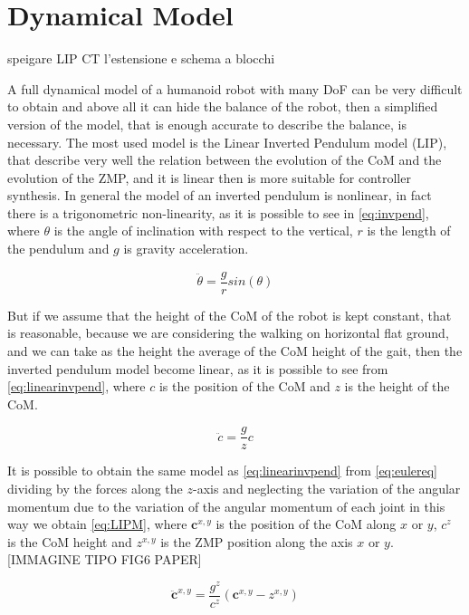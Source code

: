 \documentclass[a4paper]{article}
\begin{document}
\section{Dynamical Model}
speigare LIP CT l'estensione e schema a blocchi 

A full dynamical model of a humanoid robot with many DoF can be very difficult to obtain and above all it can hide the balance of the robot, then a simplified version of the model, that is enough accurate to describe the balance, is necessary. The most used model is the Linear Inverted Pendulum model (LIP), that describe very well the relation between the evolution of the CoM and the evolution of the ZMP, and it is linear then is more suitable for controller synthesis. In general the model of an inverted pendulum is nonlinear, in fact there is a trigonometric non-linearity, as it is possible to see in \ref{eq:invpend}, where $\theta$ is the angle of inclination with respect to the vertical, $r$ is the length of the pendulum and $g$ is gravity acceleration. 

\begin{equation}
\ddot{\theta} = \frac{g}{r}sin(\theta)
\label{eq:invpend}
\end{equation} 

But if we assume that the height of the CoM of the robot is kept constant, that is reasonable, because we are considering the walking on horizontal flat ground, and we can take as the height the average of the CoM height of the gait, then the inverted pendulum model become linear, as it is possible to see from \ref{eq:linearinvpend}, where $c$ is the position of the CoM and $z$ is the height of the CoM.

\begin{equation}
\ddot{c} = \frac{g}{z}c
\label{eq:linearinvpend}
\end{equation} 

It is possible to obtain the same model as \ref{eq:linearinvpend} from \ref{eq:eulereq} dividing by the forces along the $z$-axis and neglecting the variation of the angular momentum due to the variation of the angular momentum of each joint in this way we obtain \ref{eq:LIPM}, where $\pmb{c}^{x,y}$ is the position of the CoM along $x$ or $y$, $c^z$ is the CoM height and $z^{x,y}$ is the ZMP position along the axis $x$ or $y$.[IMMAGINE TIPO FIG6 PAPER]

\begin{equation}
\ddot{\pmb{c}}^{x,y} = \frac{g^z}{c^z}(\pmb{c}^{x,y}-z^{x,y})
\label{eq:LIPM}
\end{equation}
\end{document}
